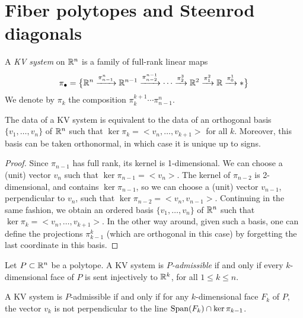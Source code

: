
\section{Fiber polytopes and Steenrod diagonals} 
\label{s:fiber polytopes and Steenrod diagonals}


\begin{definition}
    A \emph{KV system} on $\mathbb{R}^n$ is a family of full-rank linear maps 
    \[
	\pi_\bullet = \big\{
	\mathbb{R}^n \xrightarrow{\pi^n_{n-1}} \mathbb{R}^{n-1} \xrightarrow{\pi^{n-1}_{n-2}} \dotsb \xrightarrow{\pi^3_{2}} \mathbb{R}^2 \xrightarrow{\pi^2_1} \mathbb{R} \xrightarrow{\pi^1_0} * 
	\big\}
	\]
    We denote by $\pi_k$ the composition $\pi^{k+1}_{k}\cdots\pi^n_{n-1}$.
\end{definition}

\begin{lemma}
    The data of a KV system is equivalent to the data of an orthogonal basis $\{v_1,\ldots,v_n\}$ of $\mathbb{R}^n$ such that $\ker \pi_k= <v_n, \ldots, v_{k+1}>$ for all $k$. 
    Moreover, this basis can be taken orthonormal, in which case it is unique up to signs.
\end{lemma}

\begin{proof}
    Since $\pi_{n-1}$ has full rank, its kernel is 1-dimensional.
    We can choose a (unit) vector $v_n$ such that $\ker \pi_{n-1} = <v_n>$.
    The kernel of $\pi_{n-2}$ is 2-dimensional, and contains $\ker \pi_{n-1}$, so we can choose a (unit) vector $v_{n-1}$, perpendicular to $v_n$, such that $\ker \pi_{n-2}=<v_n,v_{n-1}>$.
    Continuing in the same fashion, we obtain an ordered basis $\{v_1,\ldots, v_n\}$ of $\mathbb{R}^n$ such that $\ker \pi_{k}=<v_n,\ldots,v_{k+1}>$.
    In the other way around, given such a basis, one can define the projections $\pi^{k}_{k-1}$ (which are orthogonal in this case) by forgetting the last coordinate in this basis. 
\end{proof}

\begin{definition}
    Let $P\subset \mathbb{R}^n$ be a polytope. 
    A KV system is \emph{$P$-admissible} if and only if every $k$-dimensional face of $P$ is sent injectively to $\mathbb{R}^k$, for all $1\leq k \leq n$. 
\end{definition}

\begin{proposition}
\label{prop:P-admissible}
    A KV system is $P$-admissible if and only if for any $k$-dimensional face $F_k$ of $P$, the vector $v_k$ is not perpendicular to the line $\operatorname{\mathrm{Span}}(F_k) \cap \ker \pi_{k-1}$.
\end{proposition}

